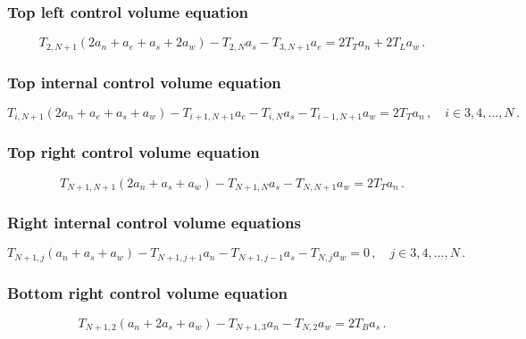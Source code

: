\documentclass{article}
\begin{document}
\subsubsection*{Top left control volume equation}

\begin{equation}
	T_{2, N+1} (2a_n + a_e + a_s + 2a_w) - T_{2,N} a_s - T_{3,N+1} a_e = 2 T_T a_n + 2 T_L a_w\,.
\end{equation}

\subsubsection*{Top internal control volume equation}

\begin{equation}
	T_{i,N+1} (2a_n + a_e + a_s + a_w) - T_{i+1,N+1}a_e - T_{i, N} a_s - T_{i-1,N+1} a_w = 2 T_T a_n\,, \quad i \in 3, 4, \ldots, N\,.
\end{equation}

\subsubsection*{Top right control volume equation}

\begin{equation}
	T_{N+1, N+1} (2a_n + a_s + a_w) - T_{N+1, N} a_s - T_{N, N+1} a_w = 2 T_T a_n\,.
\end{equation}

\subsubsection*{Right internal control volume equations}

\begin{equation}
	T_{N+1, j} (a_n + a_s + a_w) - T_{N+1, j+1} a_n - T_{N+1, j - 1} a_s - T_{N, j} a_w = 0\,, \quad j \in 3, 4, \ldots, N\,.
\end{equation}

\subsubsection*{Bottom right control volume equation}

\begin{equation}
	T_{N+1, 2} (a_n + 2 a_s + a_w) - T_{N+1, 3} a_n - T_{N, 2} a_w = 2 T_B a_s\,.
\end{equation}
\end{document}
